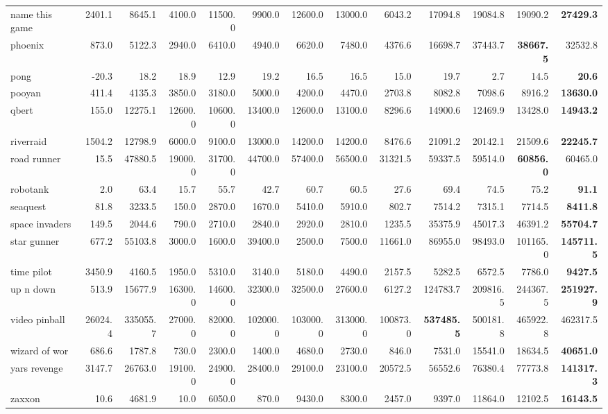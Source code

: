 \documentclass{article}
\begin{document}
\begin{table}
\begin{center}
\begin{tabularx}{1.05\textwidth}{X|rr|rrrrr|rrrr|r}
name this game  & 2401.1 & 8645.1 & 4100.0 & 11500.0 & 9900.0 & 12600.0 & 13000.0 & 6043.2 & 17094.8 & 19084.8 & 19090.2 & \textbf{27429.3} \\
phoenix  & 873.0 & 5122.3 & 2940.0 & 6410.0 & 4940.0 & 6620.0 & 7480.0 & 4376.6 & 16698.7 & 37443.7 & \textbf{38667.5} & 32532.8 \\
pong  & -20.3 & 18.2 & 18.9 & 12.9 & 19.2 & 16.5 & 16.5 & 15.0 & 19.7 & 2.7 & 14.5 & \textbf{20.6} \\
pooyan  & 411.4 & 4135.3 & 3850.0 & 3180.0 & 5000.0 & 4200.0 & 4470.0 & 2703.8 & 8082.8 & 7098.6 & 8916.2 & \textbf{13630.0} \\
qbert  & 155.0 & 12275.1 & 12600.0 & 10600.0 & 13400.0 & 12600.0 & 13100.0 & 8296.6 & 14900.6 & 12469.9 & 13428.0 & \textbf{14943.2} \\
riverraid  & 1504.2 & 12798.9 & 6000.0 & 9100.0 & 13000.0 & 14200.0 & 14200.0 & 8476.6 & 21091.2 & 20142.1 & 21509.6 & \textbf{22245.7} \\
road runner  & 15.5 & 47880.5 & 19000.0 & 31700.0 & 44700.0 & 57400.0 & 56500.0 & 31321.5 & 59337.5 & 59514.0 & \textbf{60856.0} & 60465.0 \\
robotank  & 2.0 & 63.4 & 15.7 & 55.7 & 42.7 & 60.7 & 60.5 & 27.6 & 69.4 & 74.5 & 75.2 & \textbf{91.1} \\
seaquest  & 81.8 & 3233.5 & 150.0 & 2870.0 & 1670.0 & 5410.0 & 5910.0 & 802.7 & 7514.2 & 7315.1 & 7714.5 & \textbf{8411.8} \\
space invaders  & 149.5 & 2044.6 & 790.0 & 2710.0 & 2840.0 & 2920.0 & 2810.0 & 1235.5 & 35375.9 & 45017.3 & 46391.2 & \textbf{55704.7} \\
star gunner  & 677.2 & 55103.8 & 3000.0 & 1600.0 & 39400.0 & 2500.0 & 7500.0 & 11661.0 & 86955.0 & 98493.0 & 101165.0 & \textbf{145711.5} \\
time pilot  & 3450.9 & 4160.5 & 1950.0 & 5310.0 & 3140.0 & 5180.0 & 4490.0 & 2157.5 & 5282.5 & 6572.5 & 7786.0 & \textbf{9427.5} \\
up n down  & 513.9 & 15677.9 & 16300.0 & 14600.0 & 32300.0 & 32500.0 & 27600.0 & 6127.2 & 124783.7 & 209816.5 & 244367.5 & \textbf{251927.9} \\
video pinball  & 26024.4 & 335055.7 & 27000.0 & 82000.0 & 102000.0 & 103000.0 & 313000.0 & 100873.0 & \textbf{537485.5} & 500181.8 & 465922.8 & 462317.5 \\
wizard of wor  & 686.6 & 1787.8 & 730.0 & 2300.0 & 1400.0 & 4680.0 & 2730.0 & 846.0 & 7531.0 & 15541.0 & 18634.5 & \textbf{40651.0} \\
yars revenge  & 3147.7 & 26763.0 & 19100.0 & 24900.0 & 28400.0 & 29100.0 & 23100.0 & 20572.5 & 56552.6 & 76380.4 & 77773.8 & \textbf{141317.3} \\
zaxxon  & 10.6 & 4681.9 & 10.0 & 6050.0 & 870.0 & 9430.0 & 8300.0 & 2457.0 & 9397.0 & 11864.0 & 12102.5 & \textbf{16143.5} \\
\bottomrule
\end{tabularx}
\end{center}
 

\end{table}
\end{document}

